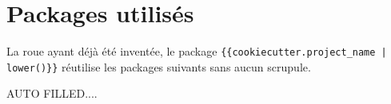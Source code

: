 \documentclass[12pt,a4paper]{book}
\begin{document}
\section{Packages utilisés}

La roue ayant déjà été inventée, le package \verb#{{cookiecutter.project_name | lower()}}# réutilise les packages suivants sans aucun scrupule.

\begin{multicols}{2}
AUTO FILLED....
\end{multicols}
\end{document}
